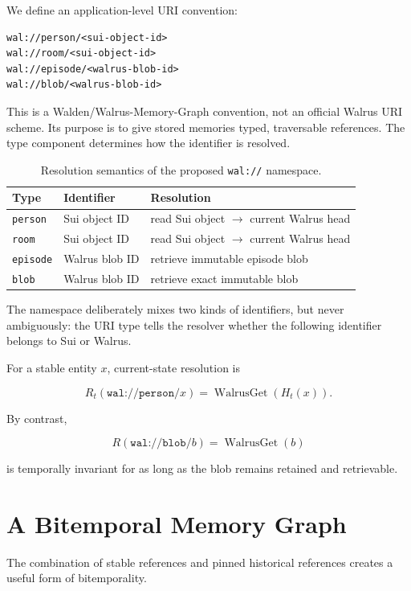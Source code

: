 \documentclass[11pt]{article}
\begin{document}
We define an application-level URI convention:

\begin{lstlisting}
wal://person/<sui-object-id>
wal://room/<sui-object-id>
wal://episode/<walrus-blob-id>
wal://blob/<walrus-blob-id>
\end{lstlisting}

This is a Walden/Walrus-Memory-Graph convention, not an official Walrus URI scheme. Its purpose is to give stored memories typed, traversable references. The type component determines how the identifier is resolved.

\begin{table}[h]
\centering
\caption{Resolution semantics of the proposed \texttt{wal://} namespace.}
\begin{tabular}{lll}
\toprule
Type & Identifier & Resolution \\
\midrule
\texttt{person} & Sui object ID & read Sui object $\rightarrow$ current Walrus head \\
\texttt{room} & Sui object ID & read Sui object $\rightarrow$ current Walrus head \\
\texttt{episode} & Walrus blob ID & retrieve immutable episode blob \\
\texttt{blob} & Walrus blob ID & retrieve exact immutable blob \\
\bottomrule
\end{tabular}
\end{table}

The namespace deliberately mixes two kinds of identifiers, but never ambiguously: the URI type tells the resolver whether the following identifier belongs to Sui or Walrus.

For a stable entity $x$, current-state resolution is

\[
R_t(\texttt{wal://person/}x)=\operatorname{WalrusGet}(H_t(x)).
\]

By contrast,

\[
R(\texttt{wal://blob/}b)=\operatorname{WalrusGet}(b)
\]

is temporally invariant for as long as the blob remains retained and retrievable.

\section{A Bitemporal Memory Graph}

The combination of stable references and pinned historical references creates a useful form of bitemporality.
\end{document}

